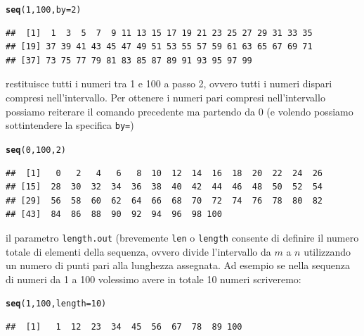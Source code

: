 \documentclass[onecolumn,11pt]{book}\usepackage[]{graphicx}\usepackage[]{color}
\makeatletter
\newcommand{\hlnum}[1]{\textcolor[rgb]{0.686,0.059,0.569}{#1}}%
\newcommand{\hlstd}[1]{\textcolor[rgb]{0.345,0.345,0.345}{#1}}%
\newcommand{\hlkwc}[1]{\textcolor[rgb]{0.333,0.667,0.333}{#1}}%
\newcommand{\hlkwd}[1]{\textcolor[rgb]{0.737,0.353,0.396}{\textbf{#1}}}%
\newenvironment{kframe}{%
 \def\at@end@of@kframe{}%
 \ifinner\ifhmode%
  \def\at@end@of@kframe{\end{minipage}}%
  \begin{minipage}{\columnwidth}%
 \fi\fi%
 \def\FrameCommand##1{\hskip\@totalleftmargin \hskip-\fboxsep
 \colorbox{shadecolor}{##1}\hskip-\fboxsep
     \hskip-\linewidth \hskip-\@totalleftmargin \hskip\columnwidth}%
 \MakeFramed {\advance\hsize-\width
   \@totalleftmargin\z@ \linewidth\hsize
   \@setminipage}}%
 {\par\unskip\endMakeFramed%
 \at@end@of@kframe}
\newenvironment{knitrout}{}{} %
\makeatother
\begin{document}
\begin{knitrout}
\color{fgcolor}\begin{kframe}
\begin{alltt}
\hlkwd{seq}\hlstd{(}\hlnum{1}\hlstd{,}\hlnum{100}\hlstd{,}\hlkwc{by}\hlstd{=}\hlnum{2}\hlstd{)}
\end{alltt}
\begin{verbatim}
##  [1]  1  3  5  7  9 11 13 15 17 19 21 23 25 27 29 31 33 35
## [19] 37 39 41 43 45 47 49 51 53 55 57 59 61 63 65 67 69 71
## [37] 73 75 77 79 81 83 85 87 89 91 93 95 97 99
\end{verbatim}
\end{kframe}
\end{knitrout}
restituisce tutti i numeri tra 1 e 100 a passo 2, ovvero tutti i numeri dispari compresi nell'intervallo.
Per ottenere i numeri pari compresi nell'intervallo possiamo reiterare il comando precedente ma partendo da 0 (e volendo possiamo sottintendere la specifica \texttt{by=})
\begin{knitrout}
\color{fgcolor}\begin{kframe}
\begin{alltt}
\hlkwd{seq}\hlstd{(}\hlnum{0}\hlstd{,}\hlnum{100}\hlstd{,}\hlnum{2}\hlstd{)}
\end{alltt}
\begin{verbatim}
##  [1]   0   2   4   6   8  10  12  14  16  18  20  22  24  26
## [15]  28  30  32  34  36  38  40  42  44  46  48  50  52  54
## [29]  56  58  60  62  64  66  68  70  72  74  76  78  80  82
## [43]  84  86  88  90  92  94  96  98 100
\end{verbatim}
\end{kframe}
\end{knitrout}
il parametro \texttt{length.out}  (brevemente \texttt{len} o \texttt{length} consente di definire il numero totale di elementi della sequenza, ovvero divide l'intervallo  da $m$ a $n$ utilizzando un numero di punti pari alla lunghezza assegnata.
Ad esempio se nella  sequenza di numeri da 1 a 100 volessimo avere in totale 10 numeri scriveremo:
\begin{knitrout}
\color{fgcolor}\begin{kframe}
\begin{alltt}
\hlkwd{seq}\hlstd{(}\hlnum{1}\hlstd{,}\hlnum{100}\hlstd{,}\hlkwc{length}\hlstd{=}\hlnum{10}\hlstd{)}
\end{alltt}
\begin{verbatim}
##  [1]   1  12  23  34  45  56  67  78  89 100
\end{verbatim}
\end{kframe}
\end{knitrout}
\end{document}
